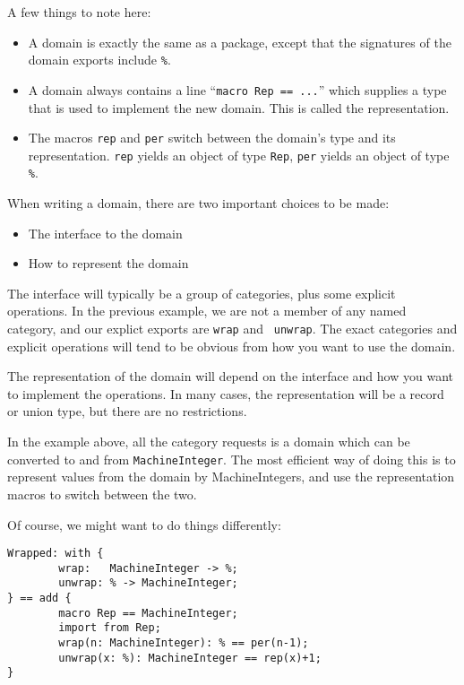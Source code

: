 \documentclass{article}
\begin{document}
A few things to note here:
\begin{itemize}
\item A domain is exactly the same as a package, except that the
signatures of the domain exports include \verb!%!.
\item A domain always contains a line ``\verb!macro Rep == ...!''
which supplies a
type that is used to implement the new domain.  This is called the
representation. 
\item The macros {\tt rep} and {\tt per} switch between the domain's
type and its representation.  {\tt rep} yields an object of type {\tt Rep},
{\tt per} yields an object of type \verb!%!.
\end{itemize}

When writing a domain, there are two important choices to be made: 
\begin{itemize}
\item The interface to the domain
\item How to represent the domain
\end{itemize}

The interface will typically be a group of categories, plus some
explicit operations. In the previous example, we are not a member of
any named category, and our explict exports are {\tt wrap} and {\tt
unwrap}.  The exact categories and explicit operations will tend to be
obvious from how you want to use the domain.

The representation of the domain will depend on the interface and how
you want to implement the operations.  In many cases, the
representation will be a record or union type, but there are no
restrictions.

In the example above, all the category requests is a domain which can
be converted to and from {\tt MachineInteger}.  The most efficient way of doing
this is to represent values from the domain by MachineIntegers, and use the
representation macros to switch between the two.

Of course, we might want to do things differently:

\begin{small}
\begin{verbatim}
Wrapped: with {
        wrap:   MachineInteger -> %;
        unwrap: % -> MachineInteger;
} == add {
        macro Rep == MachineInteger;
        import from Rep;
        wrap(n: MachineInteger): % == per(n-1);
        unwrap(x: %): MachineInteger == rep(x)+1;
}
\end{verbatim}
\end{small}
\end{document}
